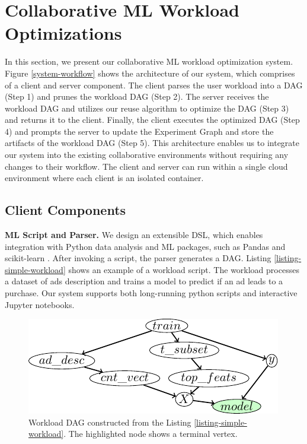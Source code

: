 \section{Collaborative ML Workload Optimizations} \label{sec-ml-workloads}
In this section, we present our collaborative ML workload optimization system.
Figure \ref{system-workflow} shows the architecture of our system, which comprises of a client and server component.
The client parses the user workload into a DAG (Step 1) and prunes the workload DAG (Step 2).
The server receives the workload DAG and utilizes our reuse algorithm to optimize the DAG (Step 3) and returns it to the client.
Finally, the client executes the optimized DAG (Step 4) and prompts the server to update the Experiment Graph and store the artifacts of the workload DAG (Step 5).
This architecture enables us to integrate our system into the existing collaborative environments without requiring any changes to their workflow.
The client and server can run within a single cloud environment where each client is an isolated container.
\subsection{Client Components}
\textbf{ML Script and Parser.}
We design an extensible DSL, which enables integration with Python data analysis and ML packages, such as Pandas \cite{mckinney-proc-scipy-2010} and scikit-learn \cite{sklearn_api}.
After invoking a script, the parser generates a DAG.
Listing \ref{listing-simple-workload} shows an example of a workload script.
The workload processes a dataset of ads description and trains a model to predict if an ad leads to a purchase.
Our system supports both long-running python scripts and interactive Jupyter notebooks.
\begin{figure}[t]
\centering
\includegraphics[width=\linewidth]{images/tikz-standalone/example-graph}
\caption{Workload DAG constructed from the Listing \ref{listing-simple-workload}. The highlighted node shows a terminal vertex.}
\label{fig-workload-dag}
\vspace{-5mm}
\end{figure}

